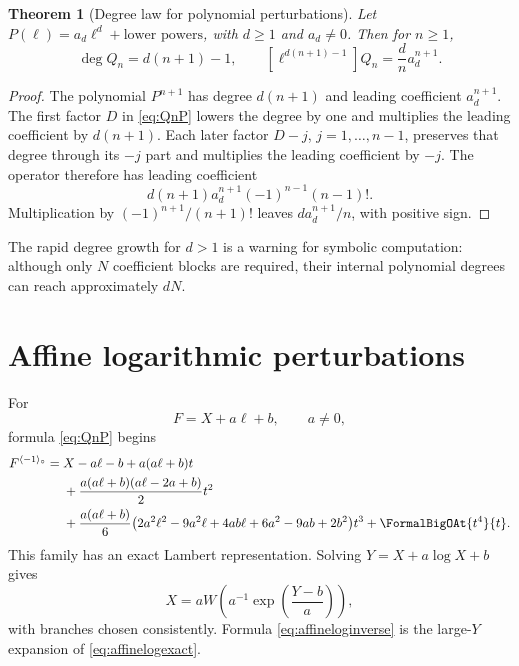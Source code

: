 \documentclass[11pt,oneside,openany]{book}
\newtheorem{theorem}{Theorem}[chapter]
\newcommand{\rev}{^{\langle-1\rangle_{\circ}}}
\begin{document}
\begin{theorem}[Degree law for polynomial perturbations]
\label{thm:degreeP}
Let \(P(\ell)=a_d\ell^d+\text{lower powers}\), with \(d\geq1\) and
\(a_d\neq0\).  Then for \(n\geq1\),
\begin{equation}\label{eq:Qdegree}
 \deg Q_n=d(n+1)-1,
 \qquad
 [\ell^{d(n+1)-1}]Q_n=\frac{d}{n}a_d^{n+1}.
\end{equation}
\end{theorem}

\begin{proof}
The polynomial \(P^{n+1}\) has degree \(d(n+1)\) and leading coefficient
\(a_d^{n+1}\).  The first factor \(D\) in \cref{eq:QnP} lowers the degree by
one and multiplies the leading coefficient by \(d(n+1)\).  Each later factor
\(D-j\), \(j=1,\ldots,n-1\), preserves that degree through its \(-j\) part and
multiplies the leading coefficient by \(-j\).  The operator therefore has
leading coefficient
\[
 d(n+1)a_d^{n+1}(-1)^{n-1}(n-1)!.
\]
Multiplication by \((-1)^{n+1}/(n+1)!\) leaves
\(d a_d^{n+1}/n\), with positive sign.
\end{proof}

The rapid degree growth for \(d>1\) is a warning for symbolic computation:
although only \(N\) coefficient blocks are required, their internal polynomial
degrees can reach approximately \(dN\).

\section{Affine logarithmic perturbations}
For
\begin{equation}\label{eq:affinelogF}
 F=X+a\ell+b,
 \qquad a\neq0,
\end{equation}
formula \cref{eq:QnP} begins
\begin{align}
 F\rev={}&X-a\ell-b
 +a(a\ell+b)t\notag\\
 &+\frac{a(a\ell+b)(a\ell-2a+b)}{2}t^2\notag\\
 &+\frac{a(a\ell+b)}{6}
 \bigl(2a^2\ell^2-9a^2\ell+4ab\ell
       +6a^2-9ab+2b^2\bigr)t^3
 +\FormalBigOAt{t^4}{t}.
 \label{eq:affineloginverse}
\end{align}
This family has an exact Lambert representation.  Solving
\(Y=X+a\log X+b\) gives
\begin{equation}\label{eq:affinelogexact}
 X=aW\!\left(a^{-1}\exp\!\left(\frac{Y-b}{a}\right)\right),
\end{equation}
with branches chosen consistently.  Formula \cref{eq:affineloginverse} is the
large-\(Y\) expansion of \cref{eq:affinelogexact}.
\end{document}
